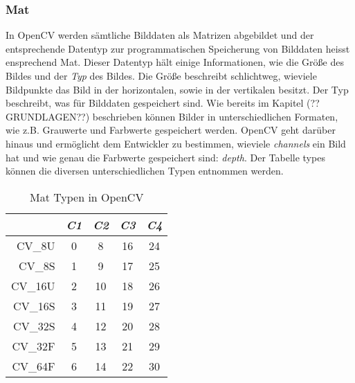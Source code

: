 \subsubsection{Mat}
In OpenCV werden sämtliche Bilddaten als Matrizen abgebildet und der entsprechende Datentyp zur programmatischen Speicherung von Bilddaten heisst ensprechend Mat. Dieser Datentyp hält einige Informationen, wie die Grö\ss{}e des Bildes und der \emph{Typ} des Bildes. Die Grö\ss{}e beschreibt schlichtweg, wieviele Bildpunkte das Bild in der horizontalen, sowie in der vertikalen besitzt. Der Typ beschreibt, was für Bilddaten gespeichert sind. Wie bereits im Kapitel (??GRUNDLAGEN??) beschrieben können Bilder in unterschiedlichen Formaten, wie z.B. Grauwerte und Farbwerte gespeichert werden. OpenCV geht darüber hinaus und ermöglicht dem Entwickler zu bestimmen, wieviele \emph{channels} ein Bild hat und wie genau die Farbwerte gespeichert sind: \emph{depth}. Der Tabelle types können die diversen unterschiedlichen Typen entnommen werden.
\begin{table}
\caption[Mat Typen in OpenCV]{Mat Typen in OpenCV\footnotemark}
\label{tab:types}
\centering
\setlength{\tabcolsep}{5mm}	%
\def\arraystretch{1.25}			%
\begin{tabular}{|r||c|c|c|c|} \hline
& \emph{C1} & \emph{C2} & \emph{C3} & \emph{C4}\\
\hline\hline
CV\_8U & 0 & 8 & 16 & 24\\
\hline
CV\_8S & 1 & 9 & 17 & 25\\
\hline
CV\_16U & 2 & 10 & 18 & 26\\
\hline
CV\_16S & 3 & 11 & 19 & 27\\
\hline
CV\_32S & 4 & 12 & 20 & 28\\
\hline
CV\_32F & 5 & 13 & 21 & 29\\
\hline
CV\_64F & 6 & 14 & 22 & 30\\
\hline
\end{tabular}
\end{table}

